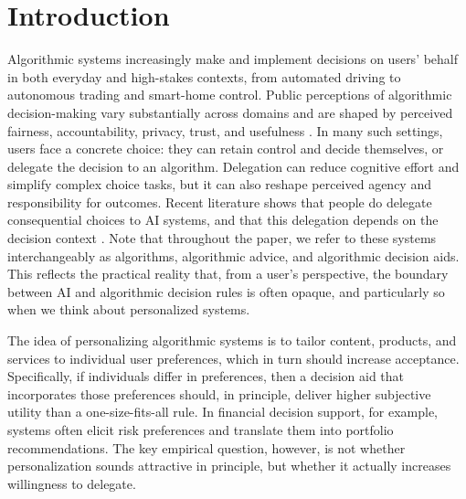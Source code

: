 \documentclass[a4paper, 12pt, fleqn]{article}
\theoremstyle{definition}
\begin{document}
\section{Introduction}\label{sec:intro}
Algorithmic systems increasingly make and implement decisions on users’ behalf in both everyday and high-stakes contexts, from automated driving %
to autonomous trading and smart-home control. Public perceptions of algorithmic decision-making vary substantially across domains and are shaped by perceived fairness, accountability, privacy, trust, and usefulness \citep{Aysolmaz2023}. In many such settings, users face a concrete choice: they can retain control and decide themselves, or delegate the decision to an algorithm. Delegation can reduce cognitive effort and simplify complex choice tasks, but it can also reshape perceived agency and responsibility for outcomes. Recent literature shows that people do delegate consequential choices to AI systems, and that this delegation depends on the decision context \citep{Candrian2022}. Note that throughout the paper, we refer to these systems interchangeably as algorithms, algorithmic advice, and algorithmic decision aids. This reflects the practical reality that, from a user's perspective, the boundary between AI and algorithmic decision rules is often opaque, and particularly so when we think about personalized systems.

The idea of personalizing algorithmic systems is to tailor content, products, and services to individual user preferences, which in turn should increase acceptance. Specifically, if individuals differ in preferences, then a decision aid that incorporates those preferences should, in principle, deliver higher subjective utility than a one-size-fits-all rule. In financial decision support, for example, systems often elicit risk preferences and translate them into portfolio recommendations. The key empirical question, however, is not whether personalization sounds attractive in principle, but whether it actually increases willingness to delegate.
\end{document}
